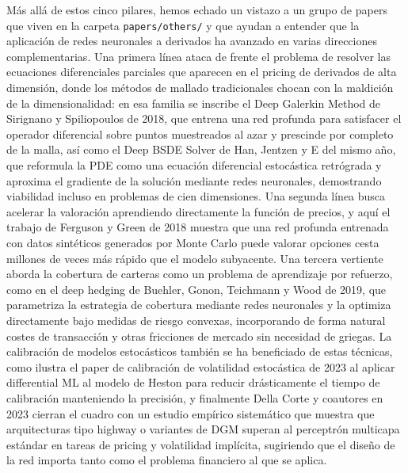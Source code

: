 \documentclass[11pt,a4paper]{article}
\begin{document}
Más allá de estos cinco pilares, hemos echado un vistazo a un grupo de papers que viven en la carpeta \texttt{papers/others/} y que ayudan a entender que la aplicación de redes neuronales a derivados ha avanzado en varias direcciones complementarias. Una primera línea ataca de frente el problema de resolver las ecuaciones diferenciales parciales que aparecen en el pricing de derivados de alta dimensión, donde los métodos de mallado tradicionales chocan con la maldición de la dimensionalidad: en esa familia se inscribe el Deep Galerkin Method de Sirignano y Spiliopoulos de 2018, que entrena una red profunda para satisfacer el operador diferencial sobre puntos muestreados al azar y prescinde por completo de la malla, así como el Deep BSDE Solver de Han, Jentzen y E del mismo año, que reformula la PDE como una ecuación diferencial estocástica retrógrada y aproxima el gradiente de la solución mediante redes neuronales, demostrando viabilidad incluso en problemas de cien dimensiones. Una segunda línea busca acelerar la valoración aprendiendo directamente la función de precios, y aquí el trabajo de Ferguson y Green de 2018 muestra que una red profunda entrenada con datos sintéticos generados por Monte Carlo puede valorar opciones cesta millones de veces más rápido que el modelo subyacente. Una tercera vertiente aborda la cobertura de carteras como un problema de aprendizaje por refuerzo, como en el deep hedging de Buehler, Gonon, Teichmann y Wood de 2019, que parametriza la estrategia de cobertura mediante redes neuronales y la optimiza directamente bajo medidas de riesgo convexas, incorporando de forma natural costes de transacción y otras fricciones de mercado sin necesidad de griegas. La calibración de modelos estocásticos también se ha beneficiado de estas técnicas, como ilustra el paper de calibración de volatilidad estocástica de 2023 al aplicar differential ML al modelo de Heston para reducir drásticamente el tiempo de calibración manteniendo la precisión, y finalmente Della Corte y coautores en 2023 cierran el cuadro con un estudio empírico sistemático que muestra que arquitecturas tipo highway o variantes de DGM superan al perceptrón multicapa estándar en tareas de pricing y volatilidad implícita, sugiriendo que el diseño de la red importa tanto como el problema financiero al que se aplica.
\end{document}
